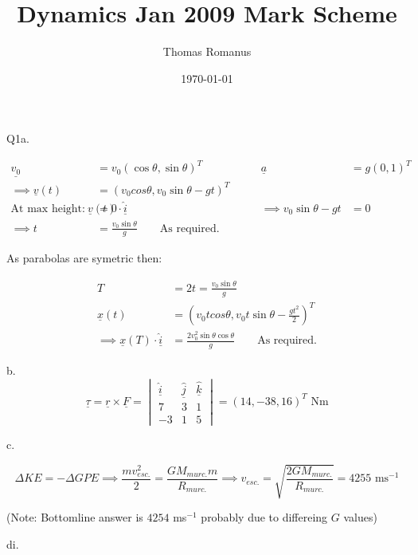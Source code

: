 \documentclass[12pt]{article}
\title{Dynamics Jan 2009 Mark Scheme}
\author{Thomas Romanus}
\date{\today}
\begin{document}
    \maketitle

    Q1a.

    \begin{equation*}
        \begin{alignedat}{2}
        \underline{v_0}&=v_0(\cos\theta,\sin\theta)^T&\qquad\underline{a}&=g(0,1)^T\\
        \implies\underline{v}(t)&=(v_0cos\theta,v_0\sin\theta-gt)^T\\
        \text{At max height:  }\underline{v}(t)\cdot\hat{\underline{i}}&=0&\qquad\implies v_0\sin\theta-gt&=0\\
        \implies t&=\frac{v_0\sin\theta}{g}\qquad\text{As required.}
        \end{alignedat}
    \end{equation*}

    As parabolas are symetric then:

    \begin{equation*}
        \begin{alignedat}{1}
            T&=2t=\frac{v_0\sin\theta}{g}\\
            \underline{x}(t)&=(v_0tcos\theta,v_0t\sin\theta-\frac{gt^2}{2})^T\\
            \implies\underline{x}(T)\cdot\hat{\underline{i}}&=\frac{2v_0^2\sin\theta\cos\theta}{g}\qquad\text{As required.}
        \end{alignedat}
    \end{equation*}

    b.
    $$\underline{\tau}=\underline{r}\times\underline{F}=
    \begin{vmatrix}
        \hat{\underline{i}} & \hat{\underline{j}} & \hat{\underline{k}} \\
        7 & 3 & 1 \\
        -3 & 1 & 5
    \end{vmatrix}
    =(14,-38,16)^T\text{ Nm}
    $$

    c.

    $$\Delta KE=-\Delta GPE\implies\frac{mv_{esc.}^2}{2}=\frac{GM_{murc.}m}{R_{murc.}}\implies v_{esc.}=\sqrt{\frac{2GM_{murc.}}{R_{murc.}}}=4255\text{ ms$^{-1}$}$$

    (Note: Bottomline answer is $4254$ ms$^{-1}$ probably due to differeing $G$ values)

    di.
\end{document}
